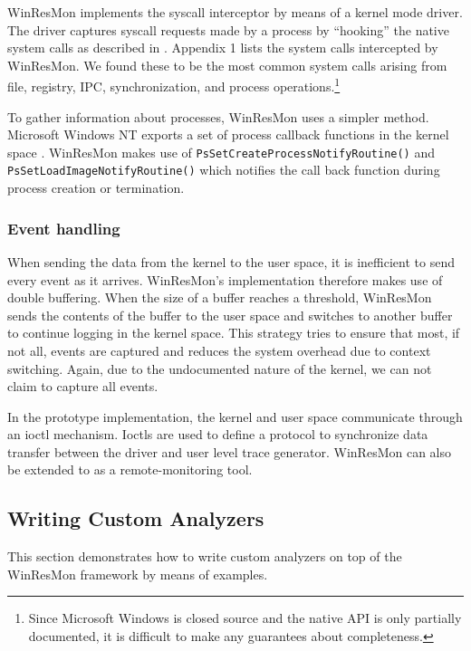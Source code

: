 WinResMon implements the syscall interceptor by means of a kernel mode driver.
The driver captures syscall requests made by a process by ``hooking'' the
native system calls as described in \cite{nthooking}.  Appendix 1 lists the
system calls intercepted by WinResMon.  We found these to be the most common
system calls arising from file, registry, IPC, synchronization, and process
operations.\footnote{ Since Microsoft Windows is closed source and the native
API is only partially documented, it is difficult to make any guarantees about
completeness.  }

To gather information about processes, WinResMon uses a simpler method.
Microsoft Windows NT exports a set of process callback functions in the kernel
space \cite{MSDN}.  WinResMon makes use of {\small\tt PsSetCreateProcessNotifyRoutine()} and
{\small\tt PsSetLoadImageNotifyRoutine()} which notifies the call back function
during process creation or termination.


\subsubsection{Event handling}

When sending the data from the kernel to the user space, it is inefficient to
send every event as it arrives.  WinResMon's implementation therefore makes use
of double buffering.  When the size of a buffer reaches a threshold, WinResMon
sends the contents of the buffer to the user space and switches to another
buffer to continue logging in the kernel space.  This strategy tries to ensure
that most, if not all, events are captured and reduces the system overhead due
to context switching.  Again, due to the undocumented nature of the kernel, we
can not claim to capture all events.

In the prototype implementation, the kernel and user space communicate through
an ioctl mechanism. Ioctls are used to define a protocol 
to synchronize data transfer between the driver and 
user level trace generator.
WinResMon can also be extended to as a remote-monitoring tool.


\subsection{Writing Custom Analyzers}
\label{sect:sample}

This section demonstrates how to write custom analyzers on top of the WinResMon
framework by means of examples.

